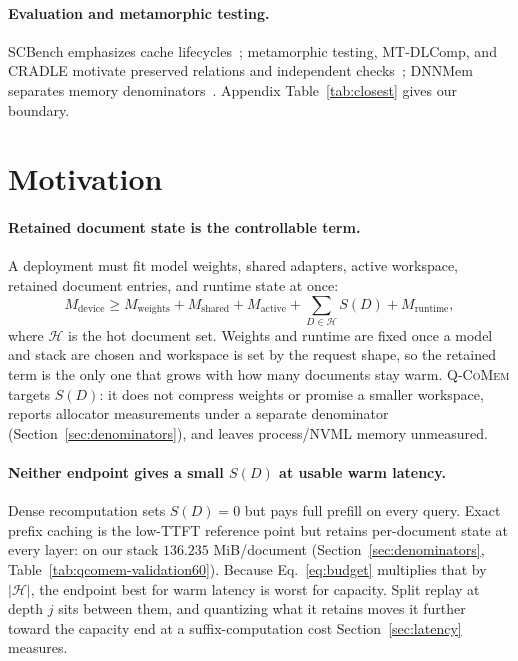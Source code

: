 \documentclass{article}
\newcommand{\qcomem}{\textsc{Q-CoMem}}
\begin{document}
\paragraph{Evaluation and metamorphic testing.}
SCBench emphasizes cache lifecycles~\citep{li2025scbench}; metamorphic testing,
MT-DLComp, and CRADLE motivate preserved relations and independent
checks~\citep{chen2018metamorphic,xiao2022metamorphic,pham2019cradle}; DNNMem
separates memory denominators~\citep{gao2020dnnmem}. Appendix
Table~\ref{tab:closest} gives our boundary.

\section{Motivation}
\label{sec:motivation}

\paragraph{Retained document state is the controllable term.}
A deployment must fit model weights, shared adapters, active workspace,
retained document entries, and runtime state at once:
\begin{equation}
 M_{\mathrm{device}} \geq M_{\mathrm{weights}}+M_{\mathrm{shared}}
 +M_{\mathrm{active}}+\sum_{D\in\mathcal{H}}S(D)+M_{\mathrm{runtime}},
 \label{eq:budget}
\end{equation}
where $\mathcal{H}$ is the hot document set. Weights and runtime are fixed once
a model and stack are chosen and workspace is set by the request shape, so the
retained term is the only one that grows with how many documents stay warm.
\qcomem{} targets $S(D)$: it does not compress weights or promise a smaller
workspace, reports allocator measurements under a separate denominator
(Section~\ref{sec:denominators}), and leaves process/NVML memory unmeasured.

\paragraph{Neither endpoint gives a small $S(D)$ at usable warm latency.}
Dense recomputation sets $S(D)=0$ but pays full prefill on every query.  Exact
prefix caching is the low-TTFT reference point but retains per-document state
at every layer: on our stack $136.235$ MiB/document
(Section~\ref{sec:denominators}, Table~\ref{tab:qcomem-validation60}).  Because
Eq.~\ref{eq:budget} multiplies that by $|\mathcal{H}|$, the endpoint best for
warm latency is worst for capacity.  Split replay at depth $j$ sits between
them, and quantizing what it retains moves it further toward the capacity end
at a suffix-computation cost Section~\ref{sec:latency} measures.
\end{document}
